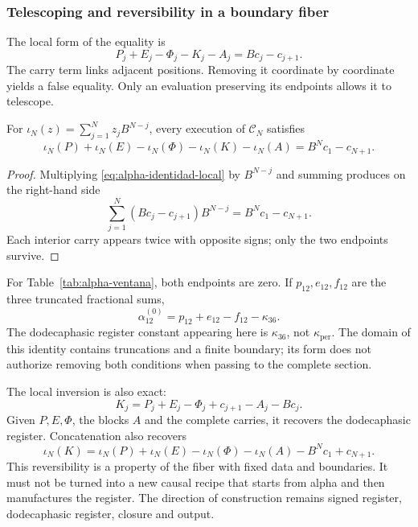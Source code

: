 \subsubsection{Telescoping and reversibility in a boundary fiber}
\label{subsec:alpha-telescopia}

The local form of the equality is
\begin{equation}
 P_j+E_j-\Phi_j-K_j-A_j=Bc_j-c_{j+1}.
 \label{eq:alpha-identidad-local}
\end{equation}
The carry term links adjacent positions. Removing it
coordinate by coordinate yields a false equality. Only an
evaluation preserving its endpoints allows it to telescope.

\begin{proposition}
\label{prop:alpha-telescopia}
For \(\iota_N(z)=\sum_{j=1}^{N}z_jB^{N-j}\), every execution of
\(\mathcal C_N\) satisfies
\begin{equation}
 \iota_N(P)+\iota_N(E)-\iota_N(\Phi)-\iota_N(K)-\iota_N(A)
 =B^Nc_1-c_{N+1}.
 \label{eq:alpha-telescopia}
\end{equation}
\end{proposition}

\begin{proof}
Multiplying \eqref{eq:alpha-identidad-local} by \(B^{N-j}\) and summing
produces on the right-hand side
\[
 \sum_{j=1}^{N}(Bc_j-c_{j+1})B^{N-j}=B^Nc_1-c_{N+1}.
\]
Each interior carry appears twice with opposite signs; only
the two endpoints survive.
\end{proof}

For Table~\ref{tab:alpha-ventana}, both endpoints are zero. If
\(p_{12},e_{12},f_{12}\) are the three truncated fractional sums,
\[
 \alpha_{12}^{(0)}=p_{12}+e_{12}-f_{12}-\kappa_{36}.
\]
The dodecaphasic register constant appearing here is \(\kappa_{36}\), not
\(\kappa_{\mathrm{per}}\). The domain of this identity contains
truncations and a finite boundary; its form does not authorize removing both
conditions when passing to the complete section.

The local inversion is also exact:
\[
 K_j=P_j+E_j-\Phi_j+c_{j+1}-A_j-Bc_j.
\]
Given \(P,E,\Phi\), the blocks \(A\) and the complete carries,
it recovers the dodecaphasic register. Concatenation also recovers
\[
 \iota_N(K)=\iota_N(P)+\iota_N(E)-\iota_N(\Phi)-\iota_N(A)
             -B^Nc_1+c_{N+1}.
\]
This reversibility is a property of the fiber with fixed data and
boundaries. It must not be turned into a new causal recipe that starts from
alpha and then manufactures the register. The direction of construction remains
signed register, dodecaphasic register, closure and output.

